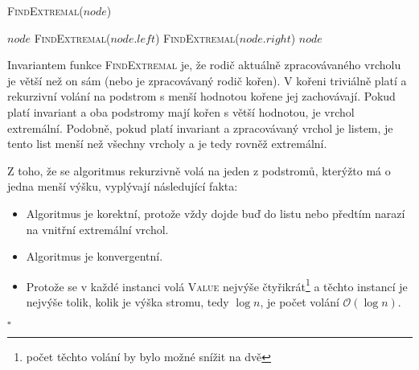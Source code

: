 \documentclass[12pt]{article}
\newcommand{\la}{\leftarrow}
\renewcommand{\O}{\mathcal{O}}
\begin{document}

\begin{algorithm}
\textsc{FindExtremal}($node$)
\begin{algorithmic}
\RETURN $node$
\RETURN \textsc{FindExtremal}($node.left$)
\RETURN \textsc{FindExtremal}($node.right$)
\ELSE
\RETURN $node$
\ENDIF
\end{algorithmic}
\end{algorithm}

Invariantem funkce \textsc{FindExtremal} je, že rodič aktuálně zpracovávaného vrcholu je větší než
on sám (nebo je zpracovávaný rodič kořen). V kořeni triviálně platí a rekurzivní volání na podstrom
s menší hodnotou kořene jej zachovávají. Pokud platí invariant a oba podstromy mají kořen s větší
hodnotou, je vrchol extremální. Podobně, pokud platí invariant a zpracovávaný vrchol je listem, je
tento list menší než všechny vrcholy a je tedy rovněž extremální.

Z toho, že se algoritmus rekurzivně volá na jeden z podstromů, kterýžto má o jedna menší výšku,
vyplývají následující fakta:

\begin{itemize}
\item Algoritmus je korektní, protože vždy dojde buď do listu nebo předtím narazí na vnitřní
extremální vrchol.
\item Algoritmus je konvergentní.
\item Protože se v každé instanci volá \textsc{Value} nejvýše čtyřikrát\footnote{počet těchto volání
by bylo možné snížit na dvě} a těchto instancí je nejvýše tolik, kolik je výška stromu, tedy $\log
n$, je počet volání $\O(\log n)$.
\end{itemize}

\hfill$\square$
\end{document}
